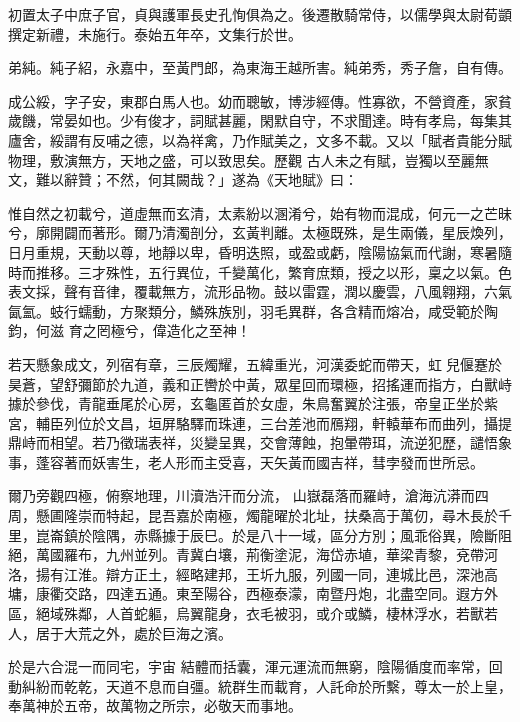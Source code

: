 \begin{pinyinscope}
 初置太子中庶子官，貞與護軍長史孔恂俱為之。後遷散騎常侍，以儒學與太尉荀顗撰定新禮，未施行。泰始五年卒，文集行於世。



 弟純。純子紹，永嘉中，至黃門郎，為東海王越所害。純弟秀，秀子詹，自有傳。



 成公綏，字子安，東郡白馬人也。幼而聰敏，博涉經傳。性寡欲，不營資產，家貧歲饑，常晏如也。少有俊才，詞賦甚麗，閑默自守，不求聞達。時有孝烏，每集其廬舍，綏謂有反哺之德，以為祥禽，乃作賦美之，文多不載。又以「賦者貴能分賦物理，敷演無方，天地之盛，可以致思矣。歷觀
 古人未之有賦，豈獨以至麗無文，難以辭贊；不然，何其闕哉？」遂為《天地賦》曰：



 惟自然之初載兮，道虛無而玄清，太素紛以溷淆兮，始有物而混成，何元一之芒昧兮，廓開闢而著形。爾乃清濁剖分，玄黃判離。太極既殊，是生兩儀，星辰煥列，日月重規，天動以尊，地靜以卑，昏明迭照，或盈或虧，陰陽協氣而代謝，寒暑隨時而推移。三才殊性，五行異位，千變萬化，繁育庶類，授之以形，稟之以氣。色表文採，聲有音律，覆載無方，流形品物。鼓以雷霆，潤以慶雲，八風翱翔，六氣氤氳。蚑行蠕動，方聚類分，鱗殊族別，羽毛異群，各含精而熔冶，咸受範於陶鈞，何滋
 育之罔極兮，偉造化之至神！



 若天懸象成文，列宿有章，三辰燭耀，五緯重光，河漢委蛇而帶天，虹兒偃蹇於昊蒼，望舒彌節於九道，義和正轡於中黃，眾星回而環極，招搖運而指方，白獸峙據於參伐，青龍垂尾於心房，玄龜匿首於女虛，朱鳥奮翼於注張，帝皇正坐於紫宮，輔臣列位於文昌，垣屏駱驛而珠連，三台差池而鴈翔，軒轅華布而曲列，攝提鼎峙而相望。若乃徵瑞表祥，災變呈異，交會薄蝕，抱暈帶珥，流逆犯歷，譴悟象事，蓬容著而妖害生，老人形而主受喜，天矢黃而國吉祥，彗孛發而世所忌。



 爾乃旁觀四極，俯察地理，川瀆浩汗而分流，
 山嶽磊落而羅峙，滄海沆漭而四周，懸圃隆崇而特起，昆吾嘉於南極，燭龍曜於北址，扶桑高于萬仞，尋木長於千里，崑崙鎮於陰隅，赤縣據于辰巳。於是八十一域，區分方別；風乖俗異，險斷阻絕，萬國羅布，九州並列。青冀白壤，荊衡塗泥，海岱赤埴，華梁青黎，兗帶河洛，揚有江淮。辯方正土，經略建邦，王圻九服，列國一同，連城比邑，深池高墉，康衢交路，四達五通。東至陽谷，西極泰濛，南暨丹炮，北盡空同。遐方外區，絕域殊鄰，人首蛇軀，烏翼龍身，衣毛被羽，或介或鱗，棲林浮水，若獸若人，居于大荒之外，處於巨海之濱。



 於是六合混一而同宅，宇宙
 結體而括囊，渾元運流而無窮，陰陽循度而率常，回動糾紛而乾乾，天道不息而自彊。統群生而載育，人託命於所繫，尊太一於上皇，奉萬神於五帝，故萬物之所宗，必敬天而事地。




\end{pinyinscope}
